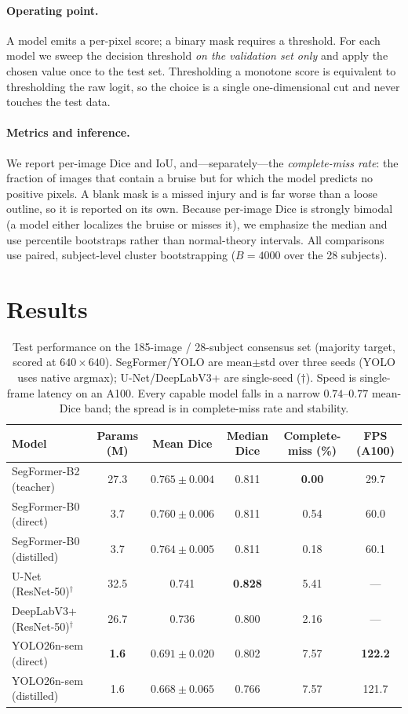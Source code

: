 \documentclass[letterpaper,twocolumn,10pt]{article}
\begin{document}
\paragraph{Operating point.}
A model emits a per-pixel score; a binary mask requires a threshold. For each
model we sweep the decision threshold \emph{on the validation set only} and apply
the chosen value once to the test set. Thresholding a monotone score is equivalent
to thresholding the raw logit, so the choice is a single one-dimensional cut and
never touches the test data.

\paragraph{Metrics and inference.}
We report per-image Dice and IoU, and---separately---the \emph{complete-miss rate}:
the fraction of images that contain a bruise but for which the model predicts no
positive pixels. A blank mask is a missed injury and is far worse than a loose
outline, so it is reported on its own. Because per-image Dice is strongly bimodal
(a model either localizes the bruise or misses it), we emphasize the median and
use percentile bootstraps rather than normal-theory intervals. All comparisons use
paired, subject-level cluster bootstrapping ($B{=}4000$ over the 28 subjects).

\section{Results}

\begin{table}[t]
\centering
\small
\caption{Test performance on the 185-image / 28-subject consensus set (majority
target, scored at $640{\times}640$). SegFormer/YOLO are mean$\pm$std over three
seeds (YOLO uses native argmax); U-Net/DeepLabV3+ are single-seed ($\dagger$).
Speed is single-frame latency on an A100. Every capable model falls in a narrow
$0.74$--$0.77$ mean-Dice band; the spread is in complete-miss rate and stability.}
\label{tab:main}
\begin{tabular}{lccccc}
\toprule
Model & Params (M) & Mean Dice & Median Dice & Complete-miss (\%) & FPS (A100) \\
\midrule
SegFormer-B2 (teacher)      & 27.3 & $0.765\pm0.004$ & 0.811 & \textbf{0.00} & 29.7 \\
SegFormer-B0 (direct)       & 3.7  & $0.760\pm0.006$ & 0.811 & 0.54 & 60.0 \\
SegFormer-B0 (distilled)    & 3.7  & $0.764\pm0.005$ & 0.811 & 0.18 & 60.1 \\
U-Net (ResNet-50)$^{\dagger}$      & 32.5 & 0.741 & \textbf{0.828} & 5.41 & --- \\
DeepLabV3+ (ResNet-50)$^{\dagger}$ & 26.7 & 0.736 & 0.800 & 2.16 & --- \\
YOLO26n-sem (direct)        & \textbf{1.6}  & $0.691\pm0.020$ & 0.802 & 7.57 & \textbf{122.2} \\
YOLO26n-sem (distilled)     & 1.6  & $0.668\pm0.065$ & 0.766 & 7.57 & 121.7 \\
\bottomrule
\end{tabular}
\end{table}
\end{document}
